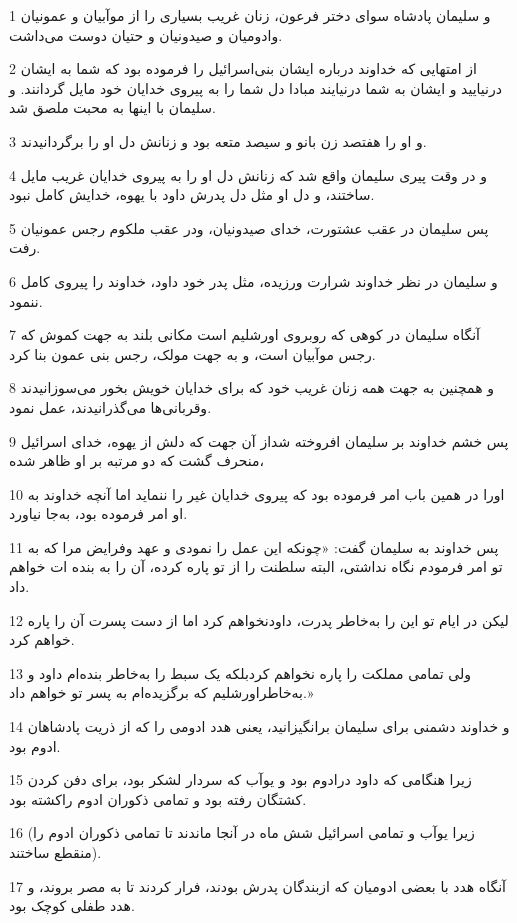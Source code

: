 \par 1 و سلیمان پادشاه سوای دختر فرعون، زنان غریب بسیاری را از موآبیان و عمونیان وادومیان و صیدونیان و حتیان دوست می‌داشت.
\par 2 از امتهایی که خداوند درباره ایشان بنی‌اسرائیل را فرموده بود که شما به ایشان درنیایید و ایشان به شما درنیایند مبادا دل شما را به پیروی خدایان خود مایل گردانند. و سلیمان با اینها به محبت ملصق شد.
\par 3 و او را هفتصد زن بانو و سیصد متعه بود و زنانش دل او را برگردانیدند.
\par 4 و در وقت پیری سلیمان واقع شد که زنانش دل او را به پیروی خدایان غریب مایل ساختند، و دل او مثل دل پدرش داود با یهوه، خدایش کامل نبود.
\par 5 پس سلیمان در عقب عشتورت، خدای صیدونیان، ودر عقب ملکوم رجس عمونیان رفت.
\par 6 و سلیمان در نظر خداوند شرارت ورزیده، مثل پدر خود داود، خداوند را پیروی کامل ننمود.
\par 7 آنگاه سلیمان در کوهی که روبروی اورشلیم است مکانی بلند به جهت کموش که رجس موآبیان است، و به جهت مولک، رجس بنی عمون بنا کرد.
\par 8 و همچنین به جهت همه زنان غریب خود که برای خدایان خویش بخور می‌سوزانیدند وقربانی‌ها می‌گذرانیدند، عمل نمود.
\par 9 پس خشم خداوند بر سلیمان افروخته شداز آن جهت که دلش از یهوه، خدای اسرائیل منحرف گشت که دو مرتبه بر او ظاهر شده،
\par 10 اورا در همین باب امر فرموده بود که پیروی خدایان غیر را ننماید اما آنچه خداوند به او امر فرموده بود، به‌جا نیاورد.
\par 11 پس خداوند به سلیمان گفت: «چونکه این عمل را نمودی و عهد وفرایض مرا که به تو امر فرمودم نگاه نداشتی، البته سلطنت را از تو پاره کرده، آن را به بنده ات خواهم داد.
\par 12 لیکن در ایام تو این را به‌خاطر پدرت، داودنخواهم کرد اما از دست پسرت آن را پاره خواهم کرد.
\par 13 ولی تمامی مملکت را پاره نخواهم کردبلکه یک سبط را به‌خاطر بنده‌ام داود و به‌خاطراورشلیم که برگزیده‌ام به پسر تو خواهم داد.»
\par 14 و خداوند دشمنی برای سلیمان برانگیزانید، یعنی هدد ادومی را که از ذریت پادشاهان ادوم بود.
\par 15 زیرا هنگامی که داود درادوم بود و یوآب که سردار لشکر بود، برای دفن کردن کشتگان رفته بود و تمامی ذکوران ادوم راکشته بود.
\par 16 (زیرا یوآب و تمامی اسرائیل شش ماه در آنجا ماندند تا تمامی ذکوران ادوم را منقطع ساختند).
\par 17 آنگاه هدد با بعضی ادومیان که ازبندگان پدرش بودند، فرار کردند تا به مصر بروند، و هدد طفلی کوچک بود.
